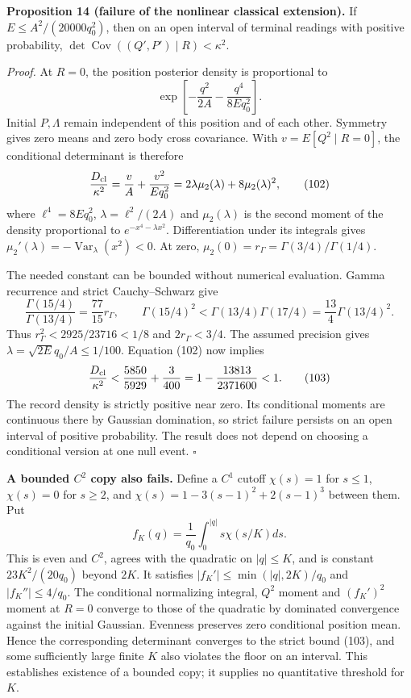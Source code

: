 \documentclass[11pt,a4paper]{article}
\begin{document}
\textbf{Proposition 14 (failure of the nonlinear classical extension).}
If \(E\le A^2/(20000q_0^2)\), then on an open interval of terminal
readings with positive probability,
\(\det\operatorname{Cov}((Q',P')\mid R)<\kappa^2\).

\emph{Proof.} At \(R=0\), the position posterior density is proportional
to \[\exp\left[-\frac{q^2}{2A}-\frac{q^4}{8Eq_0^2}\right].\] Initial
\(P,\Lambda\) remain independent of this position and of each other.
Symmetry gives zero means and zero body cross covariance. With
\(v=E[Q^2\mid R=0]\), the conditional determinant is therefore
\[\frac{D_{\rm cl}}{\kappa^2}
 =\frac vA+\frac{v^2}{Eq_0^2}
 =2\lambda\mu_2(\lambda)+8\mu_2(\lambda)^2,\tag{102}\] where
\(\ell^4=8Eq_0^2\), \(\lambda=\ell^2/(2A)\) and \(\mu_2(\lambda)\) is
the second moment of the density proportional to
\(e^{-x^4-\lambda x^2}\). Differentiation under its integrals gives
\(\mu_2'(\lambda)=-\operatorname{Var}_\lambda(x^2)<0\). At zero,
\(\mu_2(0)=r_\Gamma=\Gamma(3/4)/\Gamma(1/4)\).

The needed constant can be bounded without numerical evaluation. Gamma
recurrence and strict Cauchy--Schwarz give
\[\frac{\Gamma(15/4)}{\Gamma(13/4)}
 =\frac{77}{15}r_\Gamma,\qquad
\Gamma(15/4)^2<\Gamma(13/4)\Gamma(17/4)
 =\frac{13}{4}\Gamma(13/4)^2.\] Thus \(r_\Gamma^2<2925/23716<1/8\) and
\(2r_\Gamma<3/4\). The assumed precision gives
\(\lambda=\sqrt{2E}q_0/A\le1/100\). Equation (102) now implies
\[\frac{D_{\rm cl}}{\kappa^2}
 <\frac{5850}{5929}+\frac3{400}
 =1-\frac{13813}{2371600}<1.\tag{103}\] The record density is strictly
positive near zero. Its conditional moments are continuous there by
Gaussian domination, so strict failure persists on an open interval of
positive probability. The result does not depend on choosing a
conditional version at one null event. \(\square\)

\textbf{A bounded \(C^2\) copy also fails.} Define a \(C^1\) cutoff
\(\chi(s)=1\) for \(s\le1\), \(\chi(s)=0\) for \(s\ge2\), and
\(\chi(s)=1-3(s-1)^2+2(s-1)^3\) between them. Put
\[f_K(q)=\frac1{q_0}\int_0^{|q|}s\chi(s/K)ds.\] This is even and
\(C^2\), agrees with the quadratic on \(|q|\le K\), and is constant
\(23K^2/(20q_0)\) beyond \(2K\). It satisfies
\(|f_K'|\le\min(|q|,2K)/q_0\) and \(|f_K''|\le4/q_0\). The conditional
normalizing integral, \(Q^2\) moment and \((f_K')^2\) moment at \(R=0\)
converge to those of the quadratic by dominated convergence against the
initial Gaussian. Evenness preserves zero conditional position mean.
Hence the corresponding determinant converges to the strict bound (103),
and some sufficiently large finite \(K\) also violates the floor on an
interval. This establishes existence of a bounded copy; it supplies no
quantitative threshold for \(K\).
\end{document}
